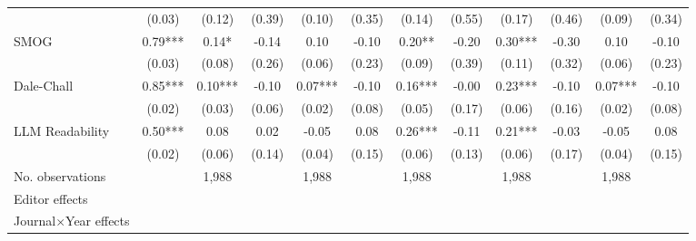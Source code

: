 \begin{table}
\begin{threeparttable}
\begin{tabular}{p{3cm}S@{}S@{}S@{}S@{}S@{}S@{}S@{}S@{}S@{}S@{}S@{}}
                                          &      (0.03)   &      (0.12)   &      (0.39)   &      (0.10)   &      (0.35)   &      (0.14)   &      (0.55)   &      (0.17)   &      (0.46)   &      (0.09)   &      (0.34)   \\
            SMOG                          &        0.79***&        0.14*  &       -0.14   &        0.10   &       -0.10   &        0.20** &       -0.20   &        0.30***&       -0.30   &        0.10   &       -0.10   \\
                                          &      (0.03)   &      (0.08)   &      (0.26)   &      (0.06)   &      (0.23)   &      (0.09)   &      (0.39)   &      (0.11)   &      (0.32)   &      (0.06)   &      (0.23)   \\
            Dale-Chall                    &        0.85***&        0.10***&       -0.10   &        0.07***&       -0.10   &        0.16***&       -0.00   &        0.23***&       -0.10   &        0.07***&       -0.10   \\
                                          &      (0.02)   &      (0.03)   &      (0.06)   &      (0.02)   &      (0.08)   &      (0.05)   &      (0.17)   &      (0.06)   &      (0.16)   &      (0.02)   &      (0.08)   \\
            LLM Readability               &        0.50***&        0.08   &        0.02   &       -0.05   &        0.08   &        0.26***&       -0.11   &        0.21***&       -0.03   &       -0.05   &        0.08   \\
                                          &      (0.02)   &      (0.06)   &      (0.14)   &      (0.04)   &      (0.15)   &      (0.06)   &      (0.13)   &      (0.06)   &      (0.17)   &      (0.04)   &      (0.15)   \\
            \midrule
            No. observations              &               &       1,988   &               &       1,988   &               &       1,988   &               &       1,988   &               &       1,988   &               \\
            \midrule
            Editor effects       &               &           {}   &               &           {}   &               &           {}   &               &           {}   &               &               &               \\
            Journal\(\times\)Year effects          &               &           {}   &               &           {}   &               &           {}   &               &           {}   &               &               &               \\

\end{tabular}
\end{threeparttable}
\end{table}
